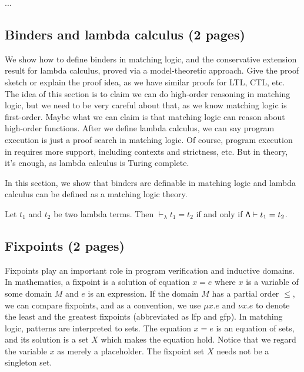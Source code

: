 \documentclass{amsart}
\begin{document}
...

\subsection{Binders and lambda calculus (2 pages)}

We show how to define binders in matching logic, and
the conservative extension result for lambda calculus,
proved via a model-theoretic approach.
Give the proof sketch or explain the proof idea,
as we have similar proofs for LTL, CTL, etc.
The idea of this section is to claim we can do high-order reasoning
in matching logic, but we need to be very careful about that,
as we know matching logic is first-order.
Maybe what we can claim is that matching logic can reason about high-order functions.
After we define lambda calculus, we can say program execution is just a proof search
in matching logic.
Of course, program execution in \K requires more support, including contexts and strictness,
etc. 
But in theory, it's enough, as lambda calculus is Turing complete.


In this section, we show that binders are definable in matching logic and
lambda calculus can be defined as a matching logic theory.
\begin{theorem}
Let $t_1$ and $t_2$ be two lambda terms. Then
$\vdash_\lambda t_1 = t_2$ if and only if
$\mathsf{\Lambda} \vdash t_1 = t_2$.
\end{theorem}

\subsection{Fixpoints (2 pages)}

Fixpoints play an important role in program verification and inductive domains.
In mathematics, a fixpoint is a solution of equation $x = e$ where $x$ is a variable
of some domain $M$ and $e$ is an expression.
If the domain $M$ has a partial order $\le$,
we can compare fixpoints, and as a convention,
we use $\mu x . e$ and $\nu x . e$ to denote the least and the greatest fixpoints 
(abbreviated as lfp and gfp).
In matching logic, patterns are interpreted to sets.
The equation $x = e$ is an equation of sets, and its solution
is a set $X$ which makes the equation hold.
Notice that we regard the variable $x$ as merely a placeholder.
The fixpoint set $X$ needs not be a singleton set.
\end{document}
